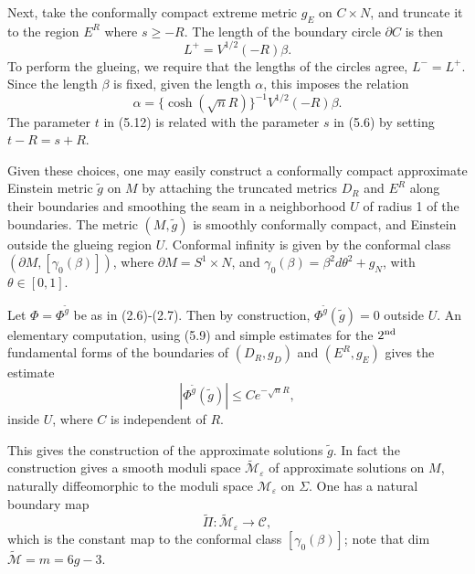 \documentclass[11pt,amsfonts]{amsart}
\begin{document}
 Next, take the conformally compact extreme metric $g_{E}$ on $C\times N$, 
and truncate it to the region $E^{R}$ where $s \geq -R$. The length of the 
boundary circle $\partial C$ is then 
\begin{equation} \label{e5.15}
L^{+} = V^{1/2}(-R)\beta . 
\end{equation}
To perform the glueing, we require that the lengths of the circles 
agree, $L^{-} = L^{+}$. Since the length $\beta$ is fixed, given the 
length $\alpha$, this imposes the relation
\begin{equation} \label{e5.16}
\alpha  = \{\cosh(\sqrt{n}R)\}^{-1}V^{1/2}(-R)\beta . 
\end{equation}
The parameter $t$ in (5.12) is related with the parameter $s$ in (5.6) 
by setting $t-R = s+R$. 

 Given these choices, one may easily construct a conformally compact 
approximate Einstein metric $\widetilde g$ on $M$ by attaching the 
truncated metrics $D_{R}$ and $E^{R}$ along their boundaries and 
smoothing the seam in a neighborhood $U$ of radius 1 of the boundaries. 
The metric $(M, \widetilde g)$ is smoothly conformally compact, and 
Einstein outside the glueing region $U$. Conformal infinity is given by 
the conformal class $(\partial M, [\gamma_{0}(\beta )])$, where 
$\partial M = S^{1}\times N$, and $\gamma_{0}(\beta) = \beta^{2}d\theta^{2} 
+ g_{N}$, with $\theta\in [0,1]$. 

  Let $\Phi  = \Phi^{\widetilde g}$ be as in (2.6)-(2.7). Then by construction, 
$\Phi^{\widetilde g}(\widetilde g) = 0$ outside $U$. An elementary computation, 
using (5.9) and simple estimates for the $2^{\rm nd}$ fundamental forms of the 
boundaries of $(D_{R}, g_{D})$ and $(E^{R}, g_{E})$ gives the estimate
\begin{equation} \label{e5.17}
|\Phi^{\widetilde g}(\widetilde g)| \leq  Ce^{-\sqrt{n}R}, 
\end{equation}
inside $U$, where $C$ is independent of $R$.

 This gives the construction of the approximate solutions 
$\widetilde g$. In fact the construction gives a smooth moduli space 
$\widetilde{\mathcal M}_{\varepsilon}$ of approximate solutions on $M$, 
naturally diffeomorphic to the moduli space ${\mathcal M}_{\varepsilon}$ on 
$\Sigma$. One has a natural boundary map 
\begin{equation} \label{e5.18}
\widetilde \Pi: \widetilde{\mathcal M}_{\varepsilon} \rightarrow{\mathcal C} , 
\end{equation}
which is the constant map to the conformal class $[\gamma_{0}(\beta)]$; note 
that dim $\widetilde{\mathcal M} = m = 6g-3$.
\end{document}
